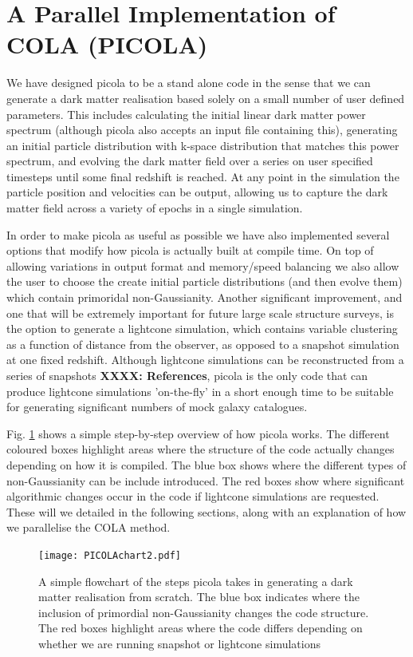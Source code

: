 \documentclass[5p,authoryear]{elsarticle}
\begin{document}
\section{A Parallel Implementation of COLA (PICOLA)}

We have designed {\sc picola} to be a stand alone code in the sense that we can generate a dark matter realisation based solely on a small number of user defined parameters. This includes calculating the initial linear dark matter power spectrum (although {\sc picola} also accepts an input file containing this), generating an initial particle distribution with k-space distribution that matches this power spectrum, and evolving the dark matter field over a series on user specified timesteps until some final redshift is reached. At any point in the simulation the particle position and velocities can be output, allowing us to capture the dark matter field across a variety of epochs in a single simulation. 

In order to make {\sc picola} as useful as possible we have also implemented several options that modify how {\sc picola} is actually built at compile time. On top of allowing variations in output format and memory/speed balancing we also allow the user to choose the create initial particle distributions (and then evolve them) which contain primoridal non-Gaussianity. Another significant improvement, and one that will be extremely important for future large scale structure surveys, is the option to generate a lightcone simulation, which contains variable clustering as a function of distance from the observer, as opposed to a snapshot simulation at one fixed redshift. Although lightcone simulations can be reconstructed from a series of snapshots \textbf{XXXX: References}, {\sc picola} is the only code that can produce lightcone simulations 'on-the-fly' in a short enough time to be suitable for generating significant numbers of mock galaxy catalogues.

Fig. \ref{PICOLAchart} shows a simple step-by-step overview of how {\sc picola} works. The different coloured boxes highlight areas where the structure of the code actually changes depending on how it is compiled. The blue box shows where the different types of non-Gaussianity can be include introduced. The red boxes show where significant algorithmic changes occur in the code if lightcone simulations are requested. These will we detailed in the following sections, along with an explanation of how we parallelise the COLA method.

\begin{figure}
\centering
\texttt{[image: PICOLAchart2.pdf]}
  \caption{A simple flowchart of the steps {\sc picola} takes in generating a dark matter realisation from scratch. The blue box indicates where the inclusion of primordial non-Gaussianity changes the code structure. The red boxes highlight areas where the code differs depending on whether we are running snapshot or lightcone simulations}
  \label{PICOLAchart}
\end{figure}
\end{document}

